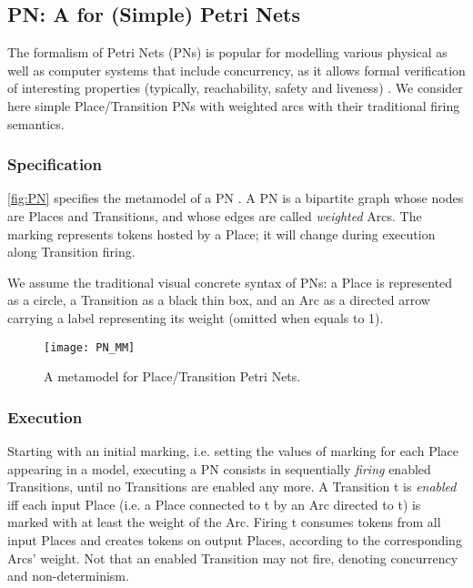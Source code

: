 \subsection{\textsf{PN}: A \DSL for (Simple) Petri Nets}
\label{sec:Examples:PN}

The formalism of Petri Nets (PNs) is popular for modelling various physical as well as
computer systems that include concurrency, as it allows formal verification of 
interesting properties (typically, reachability, safety and liveness)
\cite{B:He-Murata:2005}. We consider here simple Place/Transition PNs with weighted
arcs with their traditional firing semantics. 

\subsubsection{Specification}
\label{sec:Examples:PN:Specification}

\autoref{fig:PN} specifies the metamodel of a PN \DSL. A \textsf{PN} is a bipartite
graph whose nodes are \textsf{Place}s and \textsf{Transition}s, and whose edges are
called \emph{weighted} \textsf{Arc}s. The \textsf{marking} represents tokens hosted
by a \textsf{Place}; it will change during execution along \textsf{Transition} firing.
 
We assume the traditional visual concrete syntax of PNs: a \textsf{Place} is 
represented as a circle, a \textsf{Transition} as a black thin box, and an 
\textsf{Arc} as a directed arrow carrying a label representing its \textsf{weight}
(omitted when equals to 1).

\begin{figure}%
   \texttt{[image: PN\_MM]}%
   \caption{A metamodel for Place/Transition Petri Nets.}%
   \label{fig:FSM_MM}%
\end{figure}



\subsubsection{Execution}
\label{sec:Examples:PN:Execution}

Starting with an initial marking, i.e. setting the values of \textsf{marking} for
each \textsf{Place} appearing in a model, executing a \textsf{PN} consists in 
sequentially \emph{firing} enabled \textsf{Transition}s, until no 
\textsf{Transition}s are enabled any more. A \textsf{Transition} \textsf{t} is 
\emph{enabled} iff each input \textsf{Place} (i.e. a \textsf{Place} connected to
\textsf{t} by an \textsf{Arc} directed to \textsf{t}) is marked with at least the
weight of the \textsf{Arc}. Firing \textsf{t} consumes tokens from all input 
\textsf{Place}s and creates tokens on output \textsf{Place}s, according to the
corresponding \textsf{Arc}s' \textsf{weight}. Not that an enabled \textsf{Transition}
may not fire, denoting concurrency and non-determinism.

